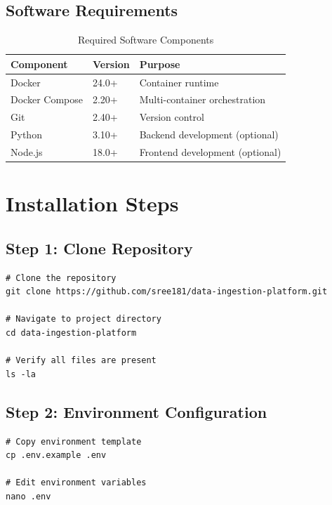 \documentclass[11pt,a4paper,twoside]{book}
\begin{document}
\subsection{Software Requirements}

\begin{table}[h]
\centering
\caption{Required Software Components}
\begin{tabularx}{\textwidth}{lXl}
\toprule
\textbf{Component} & \textbf{Version} & \textbf{Purpose} \\
\midrule
Docker & 24.0+ & Container runtime \\
Docker Compose & 2.20+ & Multi-container orchestration \\
Git & 2.40+ & Version control \\
Python & 3.10+ & Backend development (optional) \\
Node.js & 18.0+ & Frontend development (optional) \\
\bottomrule
\end{tabularx}
\end{table}

\section{Installation Steps}

\subsection{Step 1: Clone Repository}

\begin{commandbox}
\begin{lstlisting}[style=bashstyle]
# Clone the repository
git clone https://github.com/sree181/data-ingestion-platform.git

# Navigate to project directory
cd data-ingestion-platform

# Verify all files are present
ls -la
\end{lstlisting}
\end{commandbox}

\subsection{Step 2: Environment Configuration}

\begin{commandbox}
\begin{lstlisting}[style=bashstyle]
# Copy environment template
cp .env.example .env

# Edit environment variables
nano .env
\end{lstlisting}
\end{commandbox}
\end{document}
